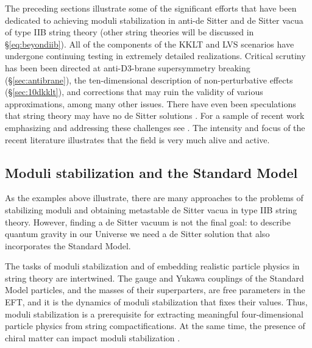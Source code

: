 \documentclass[12pt,a4wide]{article}
\begin{document}
The preceding sections illustrate some of the significant efforts 
that have been dedicated to achieving
moduli stabilization in anti-de Sitter and de Sitter vacua of type IIB string theory (other string theories will be discussed in \S\ref{eq:beyondiib}).
All of the components of the KKLT and LVS scenarios have undergone continuing testing in extremely detailed realizations. 
Critical scrutiny has been been directed at
anti-D3-brane supersymmetry breaking (\S\ref{sec:antibrane}),
the ten-dimensional description of non-perturbative effects (\S\ref{sec:10dkklt}), and corrections that may
ruin the validity of various approximations, among many other issues.  
There have even been speculations that string theory may have no de Sitter solutions \cite{Danielsson:2018ztv,Obied:2018sgi}. For a sample of recent work emphasizing and addressing  these challenges see \cite{Moritz:2017xto, Cicoli:2018kdo, Carta:2019rhx,Hamada:2018qef,Hamada:2019ack,Kachru:2019dvo,Kachru:2018aqn, Kallosh:2019axr, Hebecker:2022zme,Schreyer:2022len, Grana:2022nyp,Bena:2022ive,
Grana:2022dfw,
Bena:2021wyr,
Bena:2020xrh,
Grana:2020hyu,
Bena:2019mte,
Bena:2011wh,
Bena:2011hz,
Bena:2009xk, Crino:2020qwk,Crino:2022zjk,Junghans:2022kxg,Junghans:2022exo,Gao:2020xqh,Blaback:2014tfa,Junghans:2014wda,Junghans:2014xfa, 
Blumenhagen:2016bfp,
Lust:2022xoq,Lust:2022lfc,
ValeixoBento:2023nbv,Bento:2021nbb, Polchinski:2015bea, Cicoli:2023njy,Junghans:2023lpo}. 
The intensity and focus of the recent literature illustrates that the field is very much alive and active.



\subsection{Moduli stabilization and the Standard Model}

As the examples above illustrate, there are 
many approaches to the problems of stabilizing moduli and obtaining  metastable de Sitter vacua in type IIB string theory. 
However, finding a de Sitter vacuum is not the final goal: to describe quantum gravity in our Universe we need a de Sitter solution that also incorporates the Standard Model.  

The tasks of moduli stabilization and of embedding realistic particle physics in string theory are intertwined. 
The gauge and Yukawa couplings of the Standard Model particles, and the masses of their superparters, are free parameters in the EFT, and it is the dynamics of moduli stabilization that fixes their values.
Thus, moduli stabilization is a prerequisite for extracting meaningful four-dimensional particle physics from string compactifications.
At the same time, the presence of chiral matter can impact moduli stabilization \cite{Blumenhagen:2007sm}.
\end{document}
